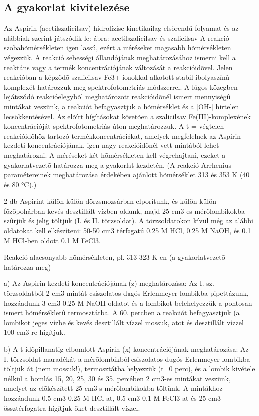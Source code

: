 \documentclass[a4paper, 12pt]{article}
\begin{document}
\subsection{A gyakorlat kivitelezése}
Az Aspirin (acetilszalicilsav) hidrolízise kinetikailag elsőrendű folyamat és az alábbiak szerint játszódik le:
ábra: acetilszalicilsav és szalicilsav
A reakció szobahõmérsékleten igen lassú, ezért a méréseket magasabb hõmérsékleten végezzük.
A reakció sebességi állandójának meghatározásához ismerni kell a reaktáns vagy a termék koncentrációjának változását a reakcióidõvel.
Jelen reakcióban a képzõdõ szalicilsav Fe3+ ionokkal alkotott stabil ibolyaszínû komplexét határozzuk meg spektrofotometriás módszerrel.
A lúgos közegben lejátszódó reakcióelegybõl meghatározott reakcióidõnél ismert mennyiségû mintákat veszünk, a reakciót befagyasztjuk a hõmérséklet és a [OH-] hirtelen lecsökkentésével.
Az elõírt hígításokat követõen a szalicilsav Fe(III)-komplexének koncentrációját spektrofotometriás úton meghatározzuk.
A t = végtelen reakcióidõhöz tartozó termékkoncentrációkat, amelyek megfelelnek az Aspirin kezdeti koncentrációjának, igen nagy reakcióidõnél vett mintából lehet meghatározni.
A méréseket két hõmérsékleten kell végrehajtani, ezeket a gyakorlatvezetõ határozza meg a gyakorlat kezdetén.
(A reakció Arrhenius paramétereinek meghatározása érdekében ajánlott hõmérséklet 313 és 353 K (40 és 80 °C).)

2 db Aspirint külön-külön dörzsmozsárban elporítunk, és külön-külön fõzõpohárban kevés desztillált vízben oldunk, majd 25 cm3-es mérõlombikokba szûrjük és jelig töltjük (I. és II. törzsoldat).
A törzsoldatokon kívül még az alábbi oldatokat kell elkészíteni: 50-50 cm3 térfogatú 0.25 M HCl, 0.25 M NaOH, és 0.1 M HCl-ben oldott 0.1 M FeCl3.


Reakció alacsonyabb hõmérsékleten, pl. 313-323 K-en (a gyakorlatvezetõ határozza meg)

a) Az Aspirin kezdeti koncentrációjának (z) meghatározása:
Az I. sz. törzsoldatból 2 cm3 mintát csiszolatos dugós Erlenmeyer lombikba pipettázunk, hozzáadunk 3 cm3 0.25 M NaOH oldatot és a lombikot belehelyezzük a pontosan ismert hõmérsékletû termosztátba. 
A 60. percben a reakciót befagyasztjuk (a lombikot jeges vízbe és kevés desztillált vízzel mossuk, atot és desztillált vízzel 100 cm3-re hígítjuk.


b) A t idõpillanatig elbomlott Aspirin (x) koncentrációjának meghatározása:
Az I. törzsoldat maradékát a mérõlombikból csiszolatos dugós Erlenmeyer lombikba töltjük át (nem mossuk!), termosztátba helyezzük (t=0 perc), és a lombik kivétele nélkül a bomlás 15, 20, 25, 30 és 35. percében 2 cm3-es mintákat veszünk, amelyet az elõkészített 25 cm3-s mérõlombikokba töltünk.
A mintákhoz hozzáadunk 0.5 cm3 0.25 M HCl-at, 0.5 cm3 0.1 M FeCl3-at és 25 cm3 össztérfogatra hígítjuk õket desztillált vízzel.
\end{document}
